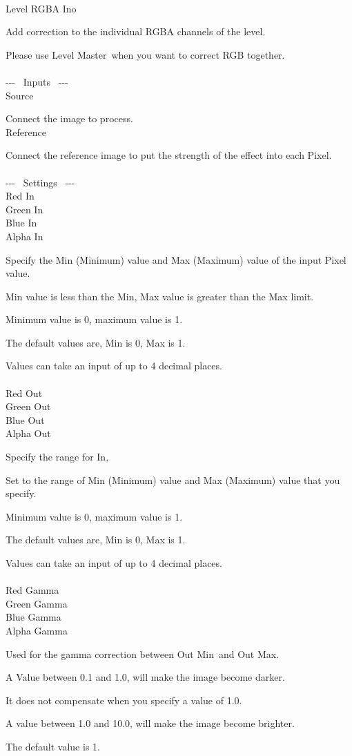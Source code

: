 \documentclass[a4paper,12pt]{article}
\begin{document}
\thispagestyle{empty}

\Large
\noindent \\
Level RGBA Ino\medskip
\par
\normalsize
Add correction to the individual RGBA channels of the level.\par
Please use \textquotedbl Level Master\textquotedbl \ when you want to correct RGB together.\\
\\
-{-}- \ Inputs \ -{-}-\\
Source\par
Connect the image to process.\\
Reference\par
Connect the reference image to put the strength of the effect into each Pixel.\\
\\
-{-}- \ Settings \ -{-}-\\
Red In\\
Green In\\
Blue In\\
Alpha In\par
Specify the Min (Minimum) value and Max (Maximum) value of the input Pixel value.\par
Min value is less than the Min, Max value is greater than the Max limit.\par
Minimum value is 0, maximum value is 1.\par
The default values are, Min is 0, Max is 1.\par
Values can take an input of up to 4 decimal places.\\
\\
Red Out\\
Green Out\\
Blue Out\\
Alpha Out\par
Specify the range for \textquotedbl In\textquotedbl ,\par
Set to the range of Min (Minimum) value and Max (Maximum) value that you specify.\par
Minimum value is 0, maximum value is 1.\par
The default values are, Min is 0, Max is 1.\par
Values can take an input of up to 4 decimal places.\\
\\
Red Gamma\\
Green Gamma\\
Blue Gamma\\
Alpha Gamma\par
Used for the gamma correction between \textquotedbl Out Min\textquotedbl \ and \textquotedbl Out Max\textquotedbl .\par
A Value between 0.1 and 1.0, will make the image become darker.\par
It does not compensate when you specify a value of 1.0.\par
A value between 1.0 and 10.0, will make the image become brighter.\par
The default value is 1.
\end{document}
